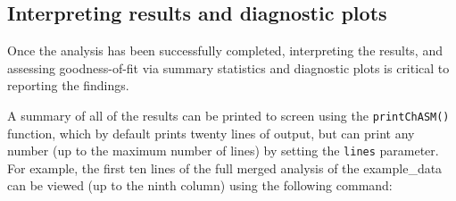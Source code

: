 \documentclass[
  letterpaper,
  DIV=11,
  numbers=noendperiod]{scrartcl}
\begin{document}
\subsection{Interpreting results and diagnostic
plots}\label{interpreting-results-and-diagnostic-plots}

Once the analysis has been successfully completed, interpreting the
results, and assessing goodness-of-fit via summary statistics and
diagnostic plots is critical to reporting the findings.

A summary of all of the results can be printed to screen using the
\texttt{printChASM()} function, which by default prints twenty lines of
output, but can print any number (up to the maximum number of lines) by
setting the \texttt{lines} parameter. For example, the first ten lines
of the full merged analysis of the example\_data can be viewed (up to
the ninth column) using the following command:

\scriptsize
\end{document}
